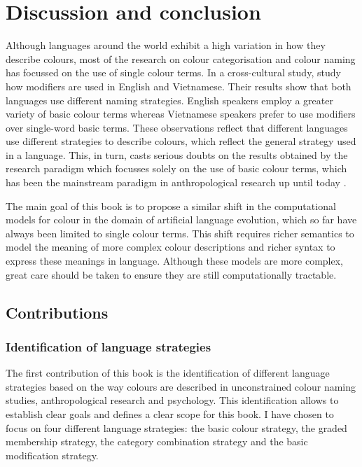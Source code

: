 \chapter{Discussion and conclusion}
\label{s:conclusion}

Although languages around the world exhibit a high variation in how
they describe colours, most of the research on colour categorisation
and colour naming has focussed on the use of single colour terms. In a
cross-cultural study, \cite{alvarado02modifying} study how modifiers
are used in English and Vietnamese. Their results show that both
languages use different naming strategies. English speakers employ a
greater variety of basic colour terms whereas Vietnamese speakers
prefer to use modifiers over single-word basic terms. These
observations reflect that different languages use different strategies 
to describe colours, which reflect the general strategy used in a language.
This, in turn, casts serious doubts on the results obtained by
the research paradigm which focusses solely on the use of basic colour
terms, which has been the mainstream paradigm in anthropological
research up until today \citep{kay10world}.

The main goal of this book is to propose a similar shift in the
computational models for colour in the domain of artificial language
evolution, which so far have always been limited to single colour terms. This
shift requires richer semantics to model the meaning of more complex
colour descriptions and richer syntax to express these meanings in
language. Although these models are more complex, great care 
should be taken to ensure they are still computationally tractable.

\section{Contributions}
\label{s:contributions}

\subsection{Identification of language strategies}

The first contribution of this book is the identification of
different language strategies based on the way colours are described
in unconstrained colour naming studies, anthropological research and
psychology. This identification allows to establish clear goals and
defines a clear scope for this book. I have chosen to focus on four
different language strategies: the basic colour strategy, the
graded membership strategy, the category combination
  strategy and the basic modification strategy.

